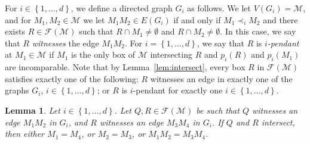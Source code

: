 \documentclass[12pt]{amsart}
\theoremstyle{plain}
\newtheorem{lemma}[theorem]{Lemma}
\theoremstyle{definition}
\theoremstyle{remark}
\newcommand{\F}{\mathcal{F}}
\newcommand{\M}{\mathcal{M}}
\newcommand{\sset}[1]{\left\{#1\right\}}
\begin{document}
For $i \in \sset{1, \dots, d}$, we define a directed graph $G_i$ as follows. We let $V(G_i) = \M$, and for $M_1, M_2 \in \M$ we let $M_1M_2 \in E(G_i)$ if and only if $M_1 \prec_i M_2$ and there exists $R \in \F(\M)$ such that $R \cap M_1 \neq \emptyset$ and $R \cap M_2 \neq \emptyset$. In this case, we say that $R$ \emph{witnesses} the edge $M_1M_2$. For $i = \sset{1, \dots, d}$, we say that $R$ is \emph{$i$-pendant} at $M_1 \in \M$ if $M_1$ is the only box of $\M$ intersecting $R$ and $p_i(R)$ and $p_i(M_1)$ are incomparable. Note that by Lemma~\ref{lem:intersect}, every box $R$ in $\F(\M)$ satisfies exactly one of the following:  
$R$ witnesses an edge in exactly one of the graphs $G_i$, $i \in \sset{1,\dots,d}$; or
 $R$ is $i$-pendant for exactly one $i \in \sset{1,\dots, d}$.


\begin{lemma} \label{lem:edges} Let $i \in \sset{1,\dots,d}$. Let $Q, R \in \F(\M)$ be such that $Q$ witnesses an edge $M_1M_2$ in $G_i$, and $R$ witnesses an edge $M_3M_4$ in $G_i$. If $Q$ and $R$ intersect, then either $M_1 = M_4$, or $M_2 = M_3$, or $M_1M_2 = M_3M_4$. 
\end{lemma}
\end{document}
